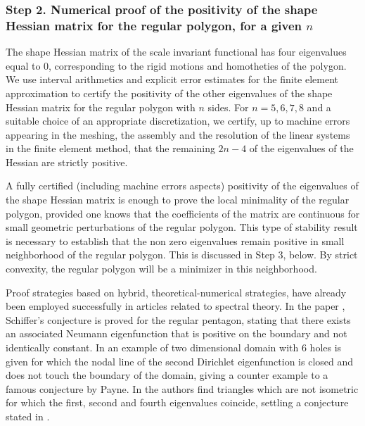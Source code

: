 \documentclass[JEP,XML,SOM,Unicode,ThmDefs,NoFloatCountersInSection,published]{cedram}
\theoremstyle{plain}
\theoremstyle{definition}
\begin{document}
\subsubsection*{Step 2. Numerical proof of the positivity of the shape Hessian matrix for the regular polygon, for a given $n$}
The shape Hessian matrix of the scale invariant functional has four eigenvalues equal to $0$, corresponding to the rigid motions and homotheties of the polygon.
We use interval arithmetics and explicit error estimates for the finite element approximation to certify the positivity of the other eigenvalues of the shape Hessian matrix for the regular polygon with $n$ sides. For $n=5,6,7,8$ and a suitable choice of an appropriate discretization, we certify, up to machine errors appearing in the meshing, the assembly and the resolution of the linear systems in the finite element method, that the remaining $2n-4$ of the eigenvalues of the Hessian are strictly positive.

A fully certified (including machine errors aspects) positivity of the eigenvalues of the shape Hessian matrix is enough to prove the local minimality of the regular polygon, provided one knows that the coefficients of the matrix are continuous for small geometric perturbations of the regular polygon. This type of stability result is necessary to establish that the non zero eigenvalues remain positive in small neighborhood of the regular polygon. This is discussed in Step 3, below. By strict convexity, the regular polygon will be a minimizer in this neighborhood.

{Proof strategies based on hybrid, theoretical-numerical strategies, have already been employed successfully in articles related to spectral theory. In the paper \cite{schiffer}, Schiffer's conjecture is proved for the regular pentagon, stating that there exists an associated Neumann eigenfunction that is positive on the boundary and not identically constant. In \cite{dahne-payne} an example of two dimensional domain with $6$ holes is given for which the nodal line of the second Dirichlet eigenfunction is closed and does not touch the boundary of the domain, giving a counter example to a famous conjecture by Payne. In \cite{three_eigs_triangle} the authors find triangles which are not isometric for which the first, second and fourth eigenvalues coincide, settling a conjecture stated in \cite{AFpolygons}.}
\end{document}
